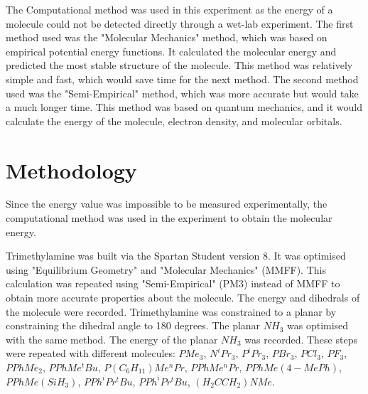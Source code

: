 \documentclass[twocolumn]{article} %
\begin{document}
The Computational method was used in this experiment as the energy of a molecule could not be detected directly through a wet-lab experiment. The first method used was the "Molecular Mechanics" method, which was based on empirical potential energy functions.\cite{MMFF1} It calculated the molecular energy and predicted the most stable structure of the molecule.\cite{MMFF2} This method was relatively simple and fast, which would save time for the next method. The second method used was the "Semi-Empirical" method, which was more accurate but would take a much longer time. This method was based on quantum mechanics, and it would calculate the energy of the molecule, electron density, and molecular orbitals. 






\section{Methodology}

Since the energy value was impossible to be measured experimentally, the computational method was used in the experiment to obtain the molecular energy. 

Trimethylamine was built via the Spartan Student version 8. It was optimised using "Equilibrium Geometry" and "Molecular Mechanics" (MMFF). This calculation was repeated using "Semi-Empirical" (PM3) instead of MMFF to obtain more accurate properties about the molecule. The energy and dihedrals of the molecule were recorded. Trimethylamine was constrained to a planar by constraining the dihedral angle to 180 degrees. The planar $NH_3$ was optimised with the same method. The energy of the planar $NH_3$ was recorded. These steps were repeated with different molecules: $PMe_3$, $N^iPr_3$, $P^iPr_3$, $PBr_3$, $PCl_3$, $PF_3$, $PPhMe_2$, $PPhMe^tBu$, $P(C_6H_{11})Me^nPr$, $PPhMe^nPr$, $PPhMe(4-MePh)$, $PPhMe(SiH_3)$, $PPh^iPr^tBu$, $PPh^iPr^tBu$, $(H_2CCH_2)NMe$.\\[1\baselineskip]
\end{document}
